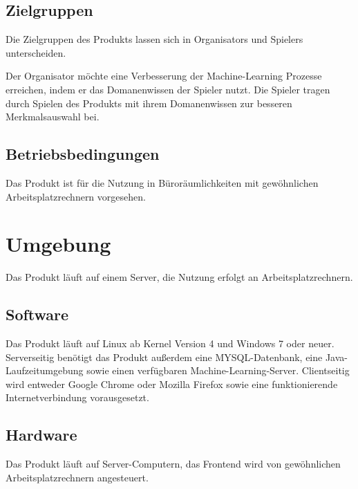 \documentclass[a4paper]{scrreprt}
\begin{document}
    \section{Zielgruppen}
    Die Zielgruppen des \Gls{Produkt}s lassen sich in \Glspl{Organisator} und \Glspl{Spieler} unterscheiden.

    Der \Gls{Organisator} möchte eine Verbesserung der Machine-Learning Prozesse erreichen, indem er das \Gls{Domanenwissen} der \Gls{Spieler} nutzt.
    Die \Gls{Spieler} tragen durch Spielen des \Gls{Produkt}s mit ihrem \Gls{Domanenwissen} zur besseren Merkmalsauswahl bei.


    \section{Betriebsbedingungen}
    Das \Gls{Produkt} ist für die Nutzung in Büroräumlichkeiten mit gewöhnlichen Arbeitsplatzrechnern vorgesehen.

    \chapter{Umgebung}
    Das \Gls{Produkt} läuft auf einem Server, die Nutzung erfolgt an Arbeitsplatzrechnern.

    \section{Software}
    Das \Gls{Produkt} läuft auf Linux ab Kernel Version 4 und Windows 7 oder neuer.
    Serverseitig benötigt das Produkt außerdem eine MYSQL-Datenbank, eine Java-Laufzeitumgebung sowie einen verfügbaren Machine-Learning-Server.
    Clientseitig wird entweder Google Chrome oder Mozilla Firefox sowie eine funktionierende Internetverbindung vorausgesetzt.

    \section{Hardware}
    Das \Gls{Produkt} läuft auf Server-Computern, das Frontend wird von gewöhnlichen Arbeitsplatzrechnern angesteuert.
\end{document}
